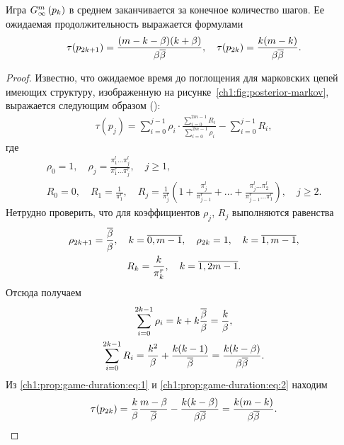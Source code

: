 {\begin{proposition}
  \label{ch1:prop:game-duration}
  Игра $G_{\infty}^m\left({p_k}\right)$ в среднем заканчивается за конечное количество шагов.
  Ее ожидаемая продолжительность выражается формулами
  \begin{equation*} 
    \tau(p_{2k+1}) = \frac{(m-k-\beta)(k+\beta)}{\beta {\overline{\beta}}},\quad
    \tau(p_{2k}) = \frac{k(m-k)}{\beta {\overline{\beta}}}.
  \end{equation*}
\end{proposition}
\begin{proof}
  Известно, что ожидаемое время до поглощения для марковских цепей имеющих структуру, изображенную на рисунке~\ref{ch1:fig:posterior-markov}, выражается следующим образом (\seename \cite[\S~12]{shiryaev11}):
  \begin{gather}
    \label{ch1:prop:game-duration:eq:1}
    \tau(p_j) =
    \sum_{i=0}^{j-1} \rho_i \cdot
    \frac{\sum_{i=0}^{2m-1} R_i}{\sum_{i=0}^{2m-1} \rho_i} -
    \sum_{i=0}^{j-1} R_i,
  \end{gather}
  где
  \begin{gather*}
  \rho_0 = 1, \quad
    \rho_j = \frac{\pi^l_1 \ldots \pi^l_j}{\pi^r_1 \ldots \pi^r_j}, \quad j \geq 1,\\
    R_0 = 0, \quad
    R_1 = \frac{1}{\pi^r_1}, \quad
    R_j = \frac{1}{\pi^r_j}\left( 
      1 + 
      \frac{\pi^l_j}{\pi^r_{j-1}} + 
      \ldots + \frac{\pi^l_j \ldots \pi^l_2}{\pi^r_{j-1} \ldots \pi^r_1}
    \right), \quad j \geq 2.
  \end{gather*}
  Нетрудно проверить, что для коэффициентов $\rho_j$, $R_j$ выполняются равенства
  \begin{gather*}
    \rho_{2k+1} = \frac{{\overline{\beta}}}{\beta},\quad k = \overline{0, m-1},\quad
    \rho_{2k} = 1,\quad k = \overline{1, m-1},\\
    R_k = \frac{k}{\pi^r_k},\quad k = \overline{1, 2m-1}.
  \end{gather*}
  Отсюда получаем
  \begin{equation}
    \label{ch1:prop:game-duration:eq:2}
    \begin{gathered}
      \sum_{i=0}^{2k-1} \rho_i = k + k \frac{{\overline{\beta}}}{\beta} = \frac{k}{\beta},\\
      \sum_{i=0}^{2k-1} R_i = \frac{k^2}{\beta} + \frac{k(k-1)}{{\overline{\beta}}} = \frac{k(k-\beta)}{\beta{\overline{\beta}}}.
    \end{gathered}
  \end{equation}
  Из \eqref{ch1:prop:game-duration:eq:1} и \eqref{ch1:prop:game-duration:eq:2} находим
  \begin{gather}
    \label{ch1:prop:game-duration:eq3}
    \tau(p_{2k}) =
    \frac{k}{\beta} \frac{m-\beta}{{\overline{\beta}}} - \frac{k(k-\beta)}{\beta{\overline{\beta}}} =
    \frac{k(m-k)}{\beta{\overline{\beta}}}.
  \end{gather}


\end{proof}}
